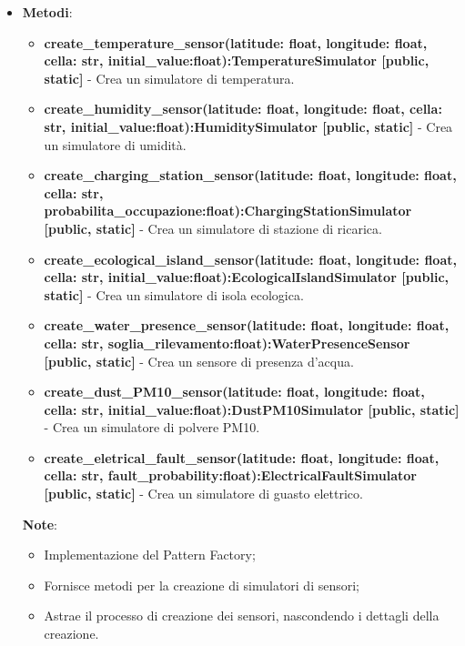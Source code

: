 \begin{itemize}
    \begin{itemize}
        \item    \textbf{Metodi}: 
\begin{itemize}
    \item \textbf{create\_temperature\_sensor(latitude: float, longitude: float, cella: str, initial\_value:float):TemperatureSimulator [public, static]} - Crea un simulatore di temperatura.
    \item \textbf{create\_humidity\_sensor(latitude: float, longitude: float, cella: str, initial\_value:float):HumiditySimulator [public, static]} - Crea un simulatore di umidità.
    \item \textbf{create\_charging\_station\_sensor(latitude: float, longitude: float, cella: str, probabilita\_occupazione:float):ChargingStationSimulator [public, static]} - Crea un simulatore di stazione di ricarica.
    \item \textbf{create\_ecological\_island\_sensor(latitude: float, longitude: float, cella: str, initial\_value:float):EcologicalIslandSimulator [public, static]} - Crea un simulatore di isola ecologica.
    \item \textbf{create\_water\_presence\_sensor(latitude: float, longitude: float, cella: str, soglia\_rilevamento:float):WaterPresenceSensor [public, static]} - Crea un sensore di presenza d'acqua.
    \item \textbf{create\_dust\_PM10\_sensor(latitude: float, longitude: float, cella: str, initial\_value:float):DustPM10Simulator [public, static]} - Crea un simulatore di polvere PM10.
    \item \textbf{create\_eletrical\_fault\_sensor(latitude: float, longitude: float, cella: str, fault\_probability:float):ElectricalFaultSimulator [public, static]} - Crea un simulatore di guasto elettrico.
\end{itemize}
\textbf{Note}:
    \begin{itemize}
        \item Implementazione del Pattern Factory;
        \item Fornisce metodi per la creazione di simulatori di sensori;
        \item Astrae il processo di creazione dei sensori, nascondendo i dettagli della creazione.
    \end{itemize}
\end{itemize}
\end{itemize}




